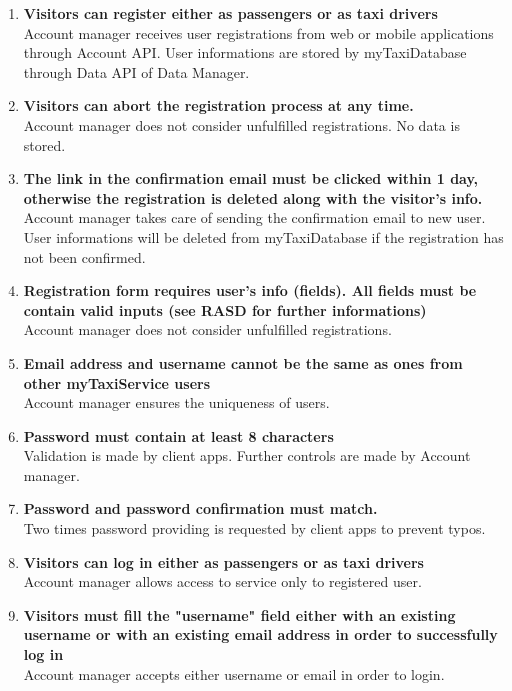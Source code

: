 \begin{enumerate}
	\item \textbf{Visitors can register either as passengers or as taxi drivers}\\
	Account manager receives user registrations from web or mobile applications through Account API. User informations are stored by myTaxiDatabase through Data API of Data Manager.

	\item \textbf{Visitors can abort the registration process at any time.}\\
	Account manager does not consider unfulfilled registrations. No data is stored.
	
	\item \textbf{The link in the confirmation email must be clicked within 1 day, otherwise the registration is deleted along with the visitor's info.}\\
	Account manager takes care of sending the confirmation email to new user. User informations will be deleted from myTaxiDatabase if the registration has not been confirmed.
	
	\item \textbf{Registration form requires user's info (fields). All fields must be contain valid inputs (see RASD for further informations)}\\
	Account manager does not consider unfulfilled registrations.	
	
	\item \textbf{Email address and username cannot be the same as ones from other myTaxiService users}\\
	Account manager ensures the uniqueness of users.
	
	\item \textbf{Password must contain at least 8 characters}\\
	Validation is made by client apps. Further controls are made by Account manager.
	
	\item \textbf{Password and password confirmation must match.}\\
	Two times password providing is requested by client apps to prevent typos.
	
	\item \textbf{Visitors can log in either as passengers or as taxi drivers}\\
	Account manager allows access to service only to registered user.
	
	\item \textbf{Visitors must fill the "username" field either with an existing username or with an existing email address in order to successfully log in}\\
	Account manager accepts either username or email in order to login.
	

\end{enumerate}
